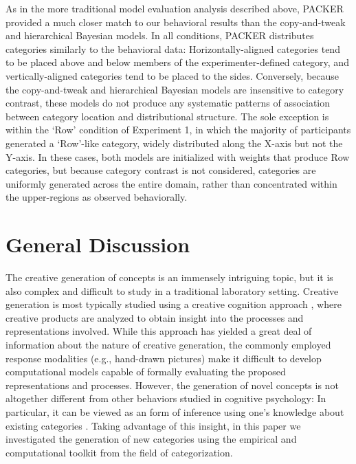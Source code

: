 \documentclass[12pt]{article}
\begin{document}
\begin{flushleft}
As in the more traditional model evaluation analysis described above, PACKER provided a much closer match to our behavioral results than the copy-and-tweak and hierarchical Bayesian models. In all conditions, PACKER distributes categories similarly to the behavioral data: Horizontally-aligned categories tend to be placed above and below members of the experimenter-defined category, and vertically-aligned categories tend to be placed to the sides. Conversely, because the copy-and-tweak and hierarchical Bayesian models are insensitive to category contrast, these models do not produce any systematic patterns of association between category location and distributional structure. The sole exception is within the `Row' condition of Experiment 1, in which the majority of participants generated a `Row'-like category, widely distributed along the X-axis but not the Y-axis. In these cases, both models are initialized with weights that produce Row categories, but because category contrast is not considered, categories are uniformly generated across the entire domain, rather than concentrated within the upper-regions as observed behaviorally.


\section{General Discussion}

The creative generation of concepts is an immensely intriguing topic, but it is also complex and difficult to study in a traditional laboratory setting. Creative generation is most typically studied using a creative cognition approach \citep{finke1992creative,smith1995creative}, where creative products \citep[such as drawings of alien plants and animals;][]{ward1994structured} are analyzed to obtain insight into the processes and representations involved. While this approach has yielded a great deal of information about the nature of creative generation, the commonly employed response modalities (e.g., hand-drawn pictures) make it difficult to develop computational models capable of formally evaluating the proposed representations and processes. However, the generation of novel concepts is not altogether different from other behaviors studied in cognitive psychology: In particular, it can be viewed as an form of inference using one's knowledge about existing categories \citep{kemp2014taxonomy,kurtz2015human}. Taking advantage of this insight, in this paper we investigated the generation of new categories using the empirical and computational toolkit from the field of categorization.


\end{flushleft}
\end{document}
